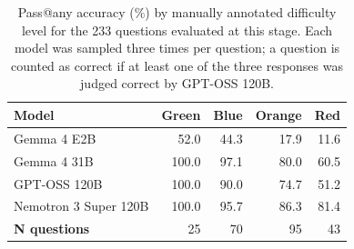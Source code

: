 \begin{table}[t]
\centering
\small
\setlength{\tabcolsep}{3pt}
\begin{tabular}{@{}lrrrr@{}}
\toprule
\textbf{Model} &
\textcolor{green!60!black}{\textbf{Green}} &
\textcolor{blue!80!black}{\textbf{Blue}} &
\textcolor{orange!90!black}{\textbf{Orange}} &
\textcolor{red!85!black}{\textbf{Red}} \\
\midrule
Gemma 4 E2B           & 52.0  & 44.3 & 17.9 & 11.6 \\
Gemma 4 31B           & 100.0 & 97.1 & 80.0 & 60.5 \\
GPT-OSS 120B          & 100.0 & 90.0 & 74.7 & 51.2 \\
Nemotron 3 Super 120B & 100.0 & 95.7 & 86.3 & 81.4 \\
\midrule
\textbf{N questions}            & 25    & 70   & 95   & 43   \\
\bottomrule
\end{tabular}
\caption{Pass@any accuracy (\%) by manually annotated difficulty level for the 233 questions evaluated at this stage. Each model was sampled three times per question; a question is counted as correct if at least one of the three responses was judged correct by GPT-OSS 120B. }
\label{tab:difficulty-models}
\vspace{-5mm}
\end{table}